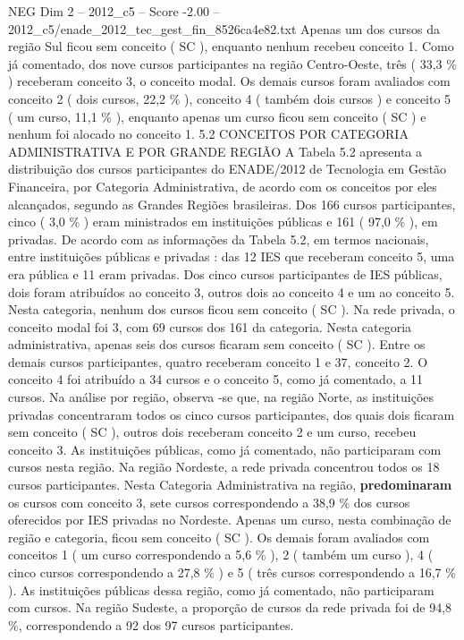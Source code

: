 \begin{textsample}{NEG Dim 2 – 2012\_c5 – Score -2.00 – 2012\_c5/enade\_2012\_tec\_gest\_fin\_8526ca4e82.txt}
Apenas um dos cursos da região Sul ficou sem conceito ( SC ), enquanto nenhum recebeu conceito 1.
Como já comentado, dos nove cursos participantes na região Centro-Oeste, três ( 33,3 \% ) receberam conceito 3, o conceito modal.
Os demais cursos foram avaliados com conceito 2 ( dois cursos, 22,2 \% ), conceito 4 ( também dois cursos ) e conceito 5 ( um curso, 11,1 \% ), enquanto apenas um curso ficou sem conceito ( SC ) e nenhum foi alocado no conceito 1. 5.2 CONCEITOS POR CATEGORIA ADMINISTRATIVA E POR GRANDE REGIÃO A Tabela 5.2 apresenta a distribuição dos cursos participantes do ENADE/2012 de Tecnologia em Gestão Financeira, por Categoria Administrativa, de acordo com os conceitos por eles alcançados, segundo as Grandes Regiões brasileiras.
Dos 166 cursos participantes, cinco ( 3,0 \% ) eram ministrados em instituições públicas e 161 ( 97,0 \% ), em privadas.
De acordo com as informações da Tabela 5.2, em termos nacionais, entre instituições públicas e privadas : das 12 IES que receberam conceito 5, uma era pública e 11 eram privadas.
Dos cinco cursos participantes de IES públicas, dois foram atribuídos ao conceito 3, outros dois ao conceito 4 e um ao conceito 5.
Nesta categoria, nenhum dos cursos ficou sem conceito ( SC ).
Na rede privada, o conceito modal foi 3, com 69 cursos dos 161 da categoria.
Nesta categoria administrativa, apenas seis dos cursos ficaram sem conceito ( SC ).
Entre os demais cursos participantes, quatro receberam conceito 1 e 37, conceito 2.
O conceito 4 foi atribuído a 34 cursos e o conceito 5, como já comentado, a 11 cursos.
Na análise por região, observa -se que, na região Norte, as instituições privadas concentraram todos os cinco cursos participantes, dos quais dois ficaram sem conceito ( SC ), outros dois receberam conceito 2 e um curso, recebeu conceito 3.
As instituições públicas, como já comentado, não participaram com cursos nesta região.
Na região Nordeste, a rede privada concentrou todos os 18 cursos participantes.
Nesta Categoria Administrativa na região, \textbf{predominaram} os cursos com conceito 3, sete cursos correspondendo a 38,9 \% dos cursos oferecidos por IES privadas no Nordeste.
Apenas um curso, nesta combinação de região e categoria, ficou sem conceito ( SC ).
Os demais foram avaliados com conceitos 1 ( um curso correspondendo a 5,6 \% ), 2 ( também um curso ), 4 ( cinco cursos correspondendo a 27,8 \% ) e 5 ( três cursos correspondendo a 16,7 \% ).
As instituições públicas dessa região, como já comentado, não participaram com cursos.
Na região Sudeste, a proporção de cursos da rede privada foi de 94,8 \%, correspondendo a 92 dos 97 cursos participantes.

\end{textsample}
